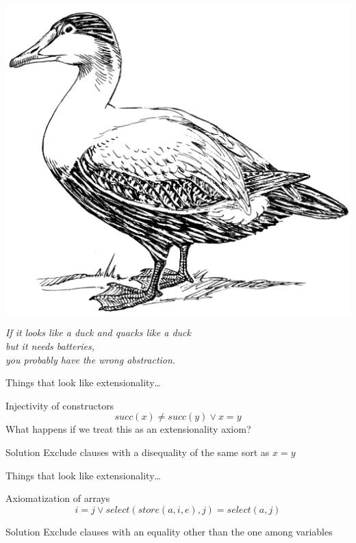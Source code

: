 \begin{frame}
  \begin{center}
    \includegraphics[width=.25\textwidth]{duck}
    
    \textit{If it looks like a duck and quacks like a duck\\ but it needs
    batteries,\\you probably have the wrong abstraction.}
  \end{center}
\end{frame}

\begin{frame}{Things that look like extensionality\dots}
  \begin{block}{Injectivity of constructors}
    \[
    succ(x) \neq succ(y) \lor x = y
    \]
    What happens if we treat this as an extensionality axiom?
  \end{block}
  
  \begin{block}{Solution}
    Exclude clauses with a disequality of the same sort as $x = y$
  \end{block}
\end{frame}

\begin{frame}{Things that look like extensionality\dots}
  \begin{block}{Axiomatization of arrays}
    \[
    i = j \lor select(store(a,i,e), j) = select(a, j)
    \]
  \end{block}

  \begin{block}{Solution}
    Exclude clauses with an equality other than the one among
    variables
  \end{block}
\end{frame}
